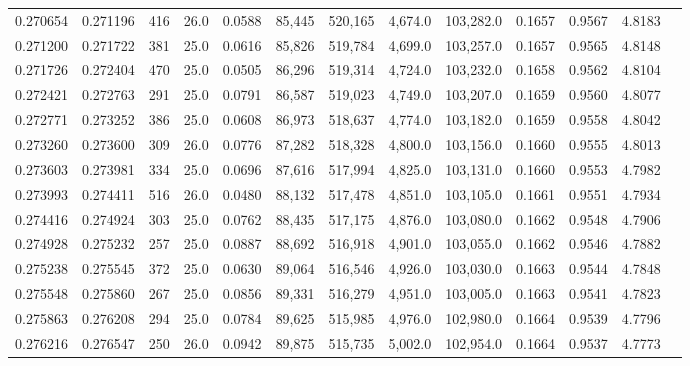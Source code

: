 \begin{tabular}{rrrrrrrrrrrrr}
0.270654 & 0.271196 &   416 & 26.0 &                                     0.0588 &  85,445 & 520,165 &   4,674.0 & 103,282.0 & 0.1657 & 0.9567 & 4.8183 \\
0.271200 & 0.271722 &   381 & 25.0 &                                     0.0616 &  85,826 & 519,784 &   4,699.0 & 103,257.0 & 0.1657 & 0.9565 & 4.8148 \\
0.271726 & 0.272404 &   470 & 25.0 &                                     0.0505 &  86,296 & 519,314 &   4,724.0 & 103,232.0 & 0.1658 & 0.9562 & 4.8104 \\
0.272421 & 0.272763 &   291 & 25.0 &                                     0.0791 &  86,587 & 519,023 &   4,749.0 & 103,207.0 & 0.1659 & 0.9560 & 4.8077 \\
0.272771 & 0.273252 &   386 & 25.0 &                                     0.0608 &  86,973 & 518,637 &   4,774.0 & 103,182.0 & 0.1659 & 0.9558 & 4.8042 \\
0.273260 & 0.273600 &   309 & 26.0 &                                     0.0776 &  87,282 & 518,328 &   4,800.0 & 103,156.0 & 0.1660 & 0.9555 & 4.8013 \\
0.273603 & 0.273981 &   334 & 25.0 &                                     0.0696 &  87,616 & 517,994 &   4,825.0 & 103,131.0 & 0.1660 & 0.9553 & 4.7982 \\
0.273993 & 0.274411 &   516 & 26.0 &                                     0.0480 &  88,132 & 517,478 &   4,851.0 & 103,105.0 & 0.1661 & 0.9551 & 4.7934 \\
0.274416 & 0.274924 &   303 & 25.0 &                                     0.0762 &  88,435 & 517,175 &   4,876.0 & 103,080.0 & 0.1662 & 0.9548 & 4.7906 \\
0.274928 & 0.275232 &   257 & 25.0 &                                     0.0887 &  88,692 & 516,918 &   4,901.0 & 103,055.0 & 0.1662 & 0.9546 & 4.7882 \\
0.275238 & 0.275545 &   372 & 25.0 &                                     0.0630 &  89,064 & 516,546 &   4,926.0 & 103,030.0 & 0.1663 & 0.9544 & 4.7848 \\
0.275548 & 0.275860 &   267 & 25.0 &                                     0.0856 &  89,331 & 516,279 &   4,951.0 & 103,005.0 & 0.1663 & 0.9541 & 4.7823 \\
0.275863 & 0.276208 &   294 & 25.0 &                                     0.0784 &  89,625 & 515,985 &   4,976.0 & 102,980.0 & 0.1664 & 0.9539 & 4.7796 \\
0.276216 & 0.276547 &   250 & 26.0 &                                     0.0942 &  89,875 & 515,735 &   5,002.0 & 102,954.0 & 0.1664 & 0.9537 & 4.7773 \\

\end{tabular}
